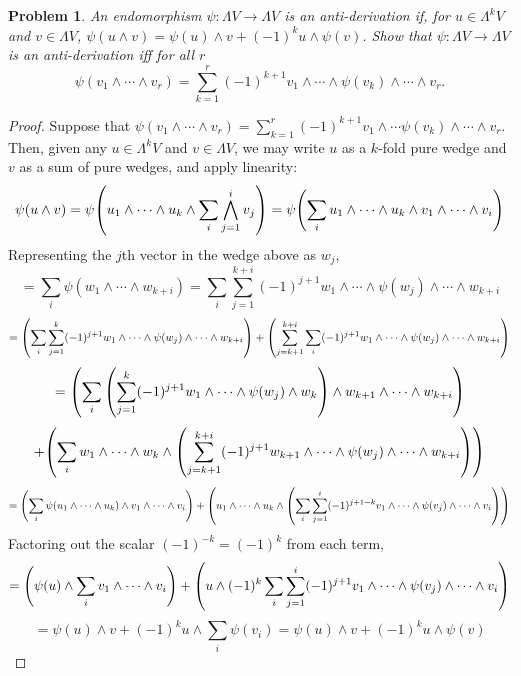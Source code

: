 \documentclass{article}
\newtheorem{plm}{Problem}
\begin{document}
\begin{plm}
  An endomorphism $\psi: \Lambda V \to \Lambda V$ is an \textit{anti-derivation} if, for $u \in \Lambda^{k}V$ and $v \in  \Lambda V$,
  $\psi(u \land v) = \psi(u) \land v + (-1)^{k}u \land \psi(v)$.
  Show that $\psi: \Lambda V \to \Lambda V$ is an anti-derivation iff for all $r$
  \[
    \psi(v_{1} \land \cdots \land v_{r}) = \sum_{k = 1}^{r}(-1)^{k+1}v_{1} \land \cdots \land \psi(v_{k}) \land \cdots \land v_{r}.
  \]
\end{plm}

\begin{proof}
  Suppose that $\psi(v_{1} \wedge \cdots \wedge v_{r}) = \sum_{k=1}^{r} (-1)^{k+1}v_{1} \wedge \cdots \psi(v_{k}) \wedge \cdots \wedge v_{r}$.
  Then, given any $u \in \Lambda^{k}V$ and $v \in \Lambda V$, we may write $u$ as a $k$-fold pure wedge and
  $v$ as a sum of pure wedges, and apply linearity:
  \[
    \psi(u \wedge v)
    = \psi\qty(u_{1} \wedge \cdots \wedge u_{k} \wedge \sum_{i}\bigwedge_{j = 1}^{i}v_{j})
    = \psi\qty(\sum_{i}u_{1} \wedge \cdots \wedge u_{k} \wedge v_{1} \wedge \cdots \wedge v_{i})
  \]
  Representing the $j$th vector in the wedge above as $w_{j}$,
  \[
    = \sum_{i}\psi(w_{1} \wedge \cdots \wedge w_{k + i})
    = \sum_{i}\sum_{j=1}^{k+i}(-1)^{j+1}w_{1} \wedge \cdots \wedge \psi(w_{j}) \wedge \cdots \wedge w_{k+i}
  \]
  \[
    = \qty(\sum_{i}\sum_{j = 1}^{k} (-1)^{j+1}w_{1} \wedge \cdots \wedge \psi(w_{j}) \wedge \cdots \wedge w_{k+i})
    + \qty(\sum_{j = k+1}^{k+i}\sum_{i}(-1)^{j+1}w_{1} \wedge \cdots \wedge \psi(w_{j}) \wedge \cdots \wedge w_{k+i})
  \]
  \[
    = \qty(\sum_{i}\qty(\sum_{j = 1}^{k} (-1)^{j+1}w_{1} \wedge \cdots \wedge \psi(w_{j}) \wedge w_{k})
    \wedge w_{k+1} \wedge \cdots \wedge w_{k+i})
  \]
  \[
    + \qty(\sum_{i}w_{1} \wedge \cdots \wedge w_{k}
    \wedge \qty(\sum_{j=k+1}^{k+i}(-1)^{j+1}w_{k+1} \wedge \cdots \wedge \psi(w_{j}) \wedge \cdots \wedge w_{k+i}))
  \]
  \[
    = \qty(\sum_{i}\psi(u_{1} \wedge \cdots \wedge u_{k}) \wedge v_{1} \wedge \cdots \wedge v_{i})
    + \qty(u_{1} \wedge \cdots \wedge u_{k} \wedge \qty(\sum_{i}\sum_{j = 1}^{i}(-1)^{j+1-k}v_{1} \wedge \cdots \wedge \psi(v_{j})
    \wedge \cdots \wedge v_{i}))
  \]
  Factoring out the scalar $(-1)^{-k} = (-1)^{k}$ from each term,
  \[
    = \qty(\psi(u)\wedge \sum_{i}v_{1} \wedge \cdots \wedge v_{i})
    + \qty(u \wedge (-1)^{k}\sum_{i}\sum_{j = 1}^{i}(-1)^{j+1}v_{1} \wedge \cdots \wedge \psi(v_{j}) \wedge \cdots \wedge{v_{i}})
  \]
  \[
    = \psi(u)\wedge v + (-1)^{k}u \wedge \sum_{i}\psi(v_{i})
    = \psi(u)\wedge v + (-1)^{k}u \wedge \psi(v)
  \]


\end{proof}
\end{document}
